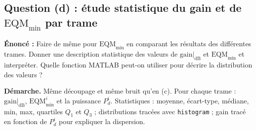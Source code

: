 \subsection{Question (d) : étude statistique du gain et de \texorpdfstring{$\mathrm{EQM}_{\min}$}{EQMmin} par trame}

\begin{enonce}
\textbf{Énoncé :} Faire de même pour $\mathrm{EQM}_{\min}$ en comparant les résultats des différentes trames. Donner une description statistique des valeurs de $\mathrm{gain}|_{\mathrm{dB}}$ et $\mathrm{EQM}_{\min}$ et interpréter. Quelle fonction MATLAB peut-on utiliser pour décrire la distribution des valeurs ?
\end{enonce}

\textbf{Démarche.} Même découpage et même bruit qu'en (c). Pour chaque trame : $\mathrm{gain}|_{\mathrm{dB}}$, $\mathrm{EQM}^i_{\min}$ et la puissance $P^i_d$. Statistiques : moyenne, écart-type, médiane, min, max, quartiles $Q_1$ et $Q_3$ ; distributions tracées avec \texttt{histogram} ; gain tracé en fonction de $P^i_d$ pour expliquer la dispersion.

